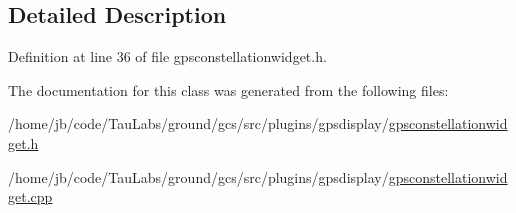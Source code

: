 \subsection{\-Detailed \-Description}


\-Definition at line 36 of file gpsconstellationwidget.\-h.



\-The documentation for this class was generated from the following files\-:\begin{DoxyCompactItemize}
\item 
/home/jb/code/\-Tau\-Labs/ground/gcs/src/plugins/gpsdisplay/\hyperlink{gpsconstellationwidget_8h}{gpsconstellationwidget.\-h}\item 
/home/jb/code/\-Tau\-Labs/ground/gcs/src/plugins/gpsdisplay/\hyperlink{gpsconstellationwidget_8cpp}{gpsconstellationwidget.\-cpp}\end{DoxyCompactItemize}

